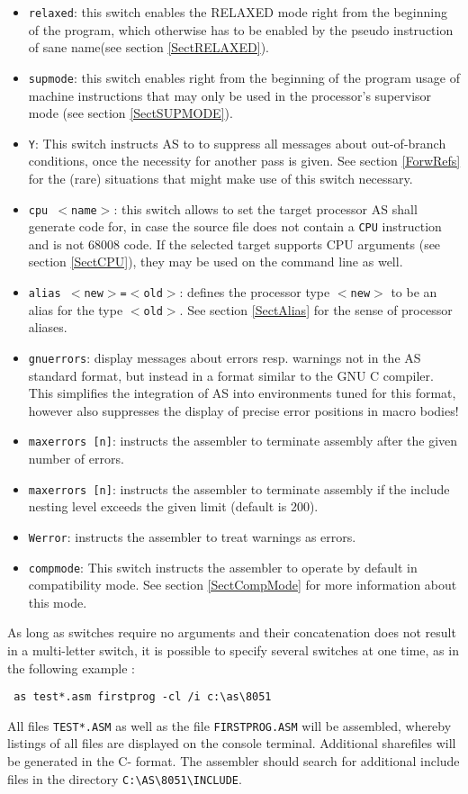 \documentclass[12pt,twoside]{report}
\newcommand{\tty}[1]{{\tt #1}}
\begin{document}
\begin{itemize}
{      the first pass.  Be prepared for a bunch of messages!!}
\item{\tty{relaxed}: this switch enables the RELAXED mode right from the
      beginning of the program, which otherwise has to be enabled by the
      pseudo instruction of sane name(see section \ref{SectRELAXED}).}
\item{\tty{supmode}: this switch enables right from the beginning of the
      program usage of machine instructions that may only be used in the
      processor's supervisor mode (see section \ref{SectSUPMODE}).}
\item{\tty{Y}: This switch instructs AS to to suppress all messages about
      out-of-branch conditions, once the necessity for another pass is given.
      See section \ref{ForwRefs} for the (rare) situations that might make
      use of this switch necessary.}
\item{\tty{cpu $<$name$>$}: this switch allows to set the target processor
      AS shall generate code for, in case the source file does not contain
      a {\tt CPU} instruction and is not 68008 code.  If the selected target
      supports CPU arguments (see section \ref{SectCPU}), they may be used
      on the command line as well.}
\item{\tty{alias $<$new$>$=$<$old$>$}:
      defines the processor type \tty{$<$new$>$} to be an alias for the
      type \tty{$<$old$>$}.  See section \ref{SectAlias} for the sense of
      processor aliases.}
\item{{\tt gnuerrors}: display messages about errors resp. warnings not
      in the AS standard format, but instead in a format similar to the
      GNU C compiler.  This simplifies the integration of AS into
      environments tuned for this format, however also suppresses the
      display of precise error positions in macro bodies!}
\item{{\tt maxerrors [n]}: instructs the assembler to terminate
      assembly after the given number of errors.}
\item{{\tt maxerrors [n]}: instructs the assembler to terminate
      assembly if the include nesting level exceeds the given limit
      (default is 200).}
\item{{\tt Werror}: instructs the assembler to treat warnings as errors.}
\item{\tty{compmode}: This switch instructs the assembler to operate by
      default in compatibility mode.  See section \ref{SectCompMode} for
      more information about this mode.}
\end{itemize}
As long as switches require no arguments and their concatenation does
not result in a multi-letter switch, it is possible to specify several
switches at one time, as in the following example :
\begin{verbatim}
 as test*.asm firstprog -cl /i c:\as\8051
\end{verbatim}
All files \tty{TEST*.ASM} as well as the file \tty{FIRSTPROG.ASM} will be
assembled, whereby listings of all files are displayed on the
console terminal.  Additional sharefiles will be generated in the C-
format.  The assembler should search for additional include files
in the directory \verb!C:\AS\8051\INCLUDE!.
\end{document}
